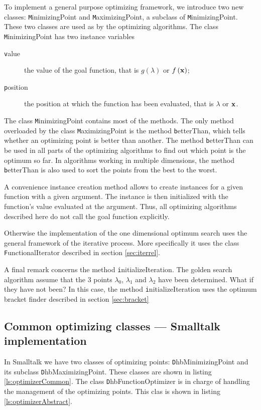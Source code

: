 To implement a general purpose optimizing framework, we introduce
two new classes: {\texttt MinimizingPoint} and {\texttt MaximizingPoint},
 a subclass of {\texttt MinimizingPoint}. These two classes
are used as  by the optimizing algorithms. The
class {\texttt MinimizingPoint} has two instance variables
\begin{description}
  \item[\texttt value] the value of the goal function, that is
  $g\left(\lambda\right)$ or $f\left({\textbf x}\right)$;
  \item[\texttt position] the position at which the function has been
  evaluated, that is $\lambda$ or ${\textbf x}$.
\end{description}
The class {\texttt MinimizingPoint} contains most of the methods. The
only method overloaded by the class {\texttt MaximizingPoint} is the
method {\texttt betterThan}, which tells whether an optimizing point
is better than another. The method {\texttt betterThan} can be used in
all parts of the optimizing algorithms to find out which point is
the optimum so far. In algorithms working in multiple dimensions,
the method {\texttt betterThan} is also used to sort the points from
the best to the worst.

A convenience instance creation method allows to create instances
for a given function with a given argument. The instance is then
initialized with the function's value evaluated at the argument.
Thus, all optimizing algorithms described here do not call the
goal function explicitly.

Otherwise the implementation of the one dimensional optimum search
uses the general framework of the iterative process. More
specifically it uses the class {\texttt FunctionalIterator} described
in section \ref{sec:iterrel}.

A final remark concerns the method {\texttt initializeIteration}. The
golden search algorithm assume that the 3 points $\lambda_0$,
$\lambda_1$ and $\lambda_2$ have been determined. What if they
have not been? In this case, the method {\texttt initializeIteration}
uses the optimum bracket finder described in section
\ref{sec:bracket}

\subsection{Common optimizing classes --- Smalltalk implementation}
\label{sec:sgeneralOpt}  In Smalltalk we have two classes
of optimizing points: {\texttt DhbMinimizingPoint} and its subclass
{\texttt DhbMaximizingPoint}. These classes are shown in listing
\ref{ls:optimizerCommon}. The class {\texttt DhbFunctionOptimizer} is
in charge of handling the management of the optimizing points.
This clas is shown in listing \ref{ls:optimizerAbstract}.

